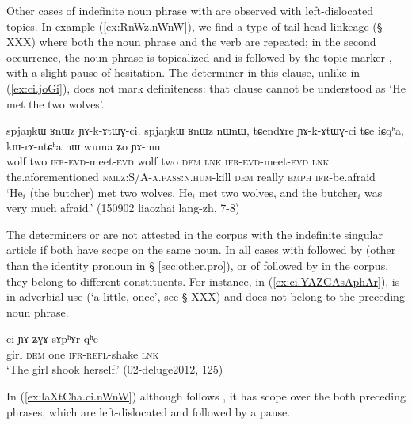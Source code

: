 Other cases of indefinite noun phrase with  are observed with left-dislocated topics. In example (\ref{ex:RnWz.nWnW}), we find a type of tail-head linkeage  (§ XXX) where both the noun phrase  and the verb  are repeated; in the second occurrence, the noun phrase is topicalized and is followed by the topic marker , with a slight pause of hesitation. The determiner  in this clause, unlike  in (\ref{ex:ci.joGi}), does not mark definiteness: that clause cannot be understood as `He met the two wolves'.

\begin{exe} 
\ex \label{ex:RnWz.nWnW} 
 \gll spjaŋkɯ ʁnɯz ɲɤ-k-ɤtɯɣ-ci. spjaŋkɯ ʁnɯz nɯnɯ, tɕendɤre ɲɤ-k-ɤtɯɣ-ci tɕe iɕqʰa, kɯ-rɤ-ntɕʰa nɯ wuma ʑo ɲɤ-mu. \\ 
 wolf two \textsc{ifr}-\textsc{evd}-meet-\textsc{evd}  wolf two \textsc{dem} \textsc{lnk} \textsc{ifr}-\textsc{evd}-meet-\textsc{evd} \textsc{lnk} the.aforementioned \textsc{nmlz}:S/A-\textsc{a.pass}:\textsc{n.hum}-kill \textsc{dem} really \textsc{emph} \textsc{ifr}-be.afraid \\ 
 \glt `He$_i$ (the butcher) met two wolves. He$_i$ met two wolves, and the butcher$_i$ was very much afraid.' (150902 liaozhai lang-zh, 7-8)
\end{exe}

The determiners  or  are not attested in the corpus with the indefinite singular article  if both have scope on the same noun. In all cases with  followed by  (other than the identity pronoun in § \ref{sec:other.pro}), or of  followed by  in the corpus, they belong to different constituents. For instance, in (\ref{ex:ci.YAZGAsAphAr}),  is in adverbial use (`a little, once', see § XXX) and does not belong to the preceding noun phrase.  

\begin{exe}
\ex \label{ex:ci.YAZGAsAphAr}
\gll [tɕʰeme nɯ] ci ɲɤ-ʑɣɤ-sɤpʰɤr qʰe  \\
girl \textsc{dem} one \textsc{ifr}-\textsc{refl}-shake \textsc{lnk} \\
\glt `The girl shook herself.' (02-deluge2012, 125)
\end{exe}

In (\ref{ex:laXtCha.ci.nWnW}) although  follows , it has scope over the both preceding phrases, which are left-dislocated and followed by a pause.

